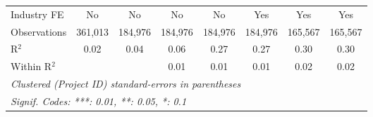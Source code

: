 \documentclass[
]{article}
\begin{document}
\begin{tabular}{lccccccc}
   Industry FE                         & No             & No             & No            & No            & Yes           & Yes            & Yes\\  
   Observations                        & 361,013        & 184,976        & 184,976       & 184,976       & 184,976       & 165,567        & 165,567\\  
   R$^2$                               & 0.02           & 0.04           & 0.06          & 0.27          & 0.27          & 0.30           & 0.30\\  
   Within R$^2$                        &                &                & 0.01          & 0.01          & 0.01          & 0.02           & 0.02\\  
   \midrule
   \multicolumn{8}{l}{\emph{Clustered (Project ID) standard-errors in parentheses}}\\
   \multicolumn{8}{l}{\emph{Signif. Codes: ***: 0.01, **: 0.05, *: 0.1}}\\
\end{tabular}
\par\endgroup
\begingroup
\centering
\small
\end{document}
